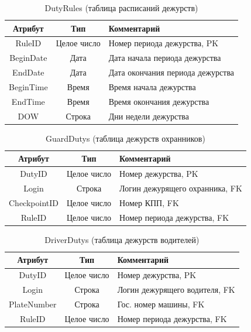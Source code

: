 \begin{table}[h!] \label{dutyrule_table}
	\begin{center}
		\caption{DutyRules (таблица расписаний дежурств)}
		\begin{tabular}{| c | c | p{10cm} |}
			\hline
			\textbf{Атрибут}		&	\textbf{Тип}		& \textbf{Комментарий} \\
			\hline
			RuleID		&	Целое число	&	Номер периода дежурства, PK \\ \hline
			BeginDate 	&	Дата		&	Дата начала периода дежурства \\ \hline
			EndDate 	&	Дата		&	Дата окончания периода дежурства \\ \hline
			BeginTime 	&	Время		&	Время начала дежурства \\ \hline
			EndTime 	&	Время		&	Время окончания дежурства \\ \hline
			DOW 		&	Строка		&	Дни недели дежурства \\ \hline
		\end{tabular}
	\end{center}
\end{table}

\begin{table}[h!] \label{gduty_table}
	\begin{center}
		\caption{GuardDutys (таблица дежурств охранников)}
		\begin{tabular}{| c | c | p{10cm} |}
			\hline
			\textbf{Атрибут}		&	\textbf{Тип}		& \textbf{Комментарий} \\
			\hline
			DutyID		&	Целое число	&	Номер дежурства, PK \\ \hline
			Login 		&	Строка		&	Логин дежурящего охранника, FK \\ \hline
			CheckpointID &	Целое число	&	Номер КПП, FK \\ \hline
			RuleID		&	Целое число	&	Номер периода дежурства, FK \\ \hline
		\end{tabular}
	\end{center}
\end{table}

\begin{table}[h!] \label{dduty_table}
	\begin{center}
		\caption{DriverDutys (таблица дежурств водителей)}
		\begin{tabular}{| c | c | p{10cm} |}
			\hline
			\textbf{Атрибут}		&	\textbf{Тип}		& \textbf{Комментарий} \\
			\hline
			DutyID		&	Целое число	&	Номер дежурства, PK \\ \hline
			Login 		&	Строка		&	Логин дежурящего водителя, FK \\ \hline
			PlateNumber &	Строка		&	Гос. номер машины, FK \\ \hline
			RuleID		&	Целое число	&	Номер периода дежурства, FK \\ \hline
		\end{tabular}
	\end{center}
\end{table}

